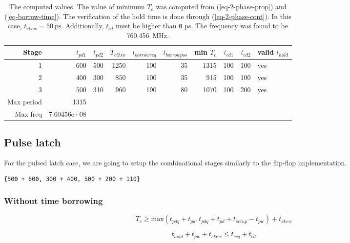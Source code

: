 \documentclass[hidelinks, 12pt]{article}
\begin{document}
\begin{table}[htbp]
\caption{\label{tab-q1-2}The computed values. The value of minimum \(T_{c}\) was computed from (\ref{eq-2-phase-prop}) and (\ref{eq-borrow-time}). The verification of the hold time is done through (\ref{eq-2-phase-cont}). In this case, \(t_{skew}=\qty{50}{\pico\s}\). Additionally, \(t_{cd}\) must be higher than \texttt{0} \unit{\pico\s}. The frequency was found to be \qty{760.456}{\mega\hertz}.}
\centering
\begin{tabular}{rrrrrrrrrl}
Stage & \(t_{pd1}\) & \(t_{pd2}\) & \(T_{ctheo}\) & \(t_{borrowreq}\) & \(t_{borrowpos}\) & min \(T_{c}\) & \(t_{cd1}\) & \(t_{cd2}\) & valid \(t_{hold}\)\\
\hline
1 & 600 & 500 & 1250 & 100 & 35 & 1315 & 100 & 100 & yes\\
2 & 400 & 300 & 850 & 100 & 35 & 915 & 100 & 100 & yes\\
3 & 500 & 310 & 960 & 190 & 80 & 1070 & 100 & 200 & yes\\
\hline
Max period & 1315 &  &  &  &  &  &  &  & \\
Max freq & 7.60456e+08 &  &  &  &  &  &  &  & \\
\end{tabular}
\end{table}
\subsection*{Pulse latch}
\label{sec:orgefd6357}
For the pulsed latch case, we are going to setup the combinational stages similarly to the flip-flop implementation.

\begin{verbatim}
{500 + 600, 300 + 400, 500 + 200 + 110}
\end{verbatim}
\subsubsection*{Without time borrowing}
\label{sec:org83514eb}

\begin{equation}
\label{eq-pulse-prop}
T_c \geq \text{max} \left( t_{pdq} + t_{pd} , t_{pdq} + t_{pd} + t_{setup} - t_{pw}  \right) + t_{skew}
\end{equation}

\begin{equation}
\label{eq-pulse-cont}
t_{hold} + t_{pw} + t_{skew} \leq t_{ccq} + t_{cd}
\end{equation}
\end{document}
